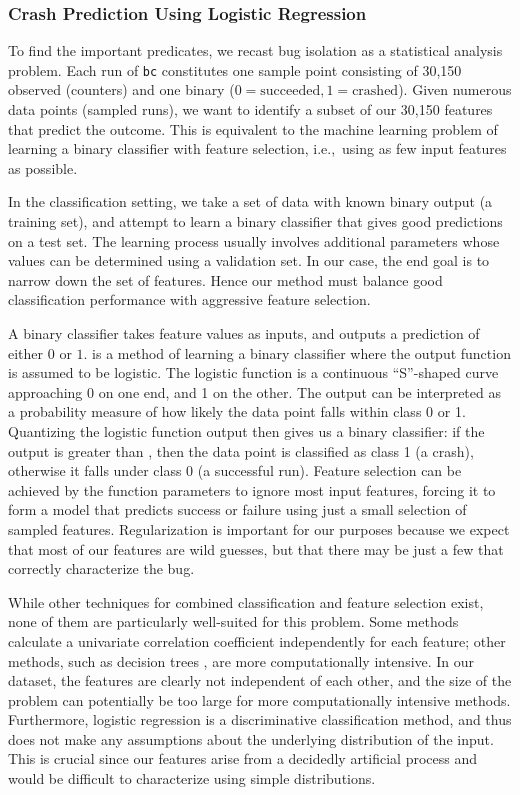 \subsubsection{Crash Prediction Using Logistic Regression}

To find the important predicates, we recast bug isolation as a
statistical analysis problem.  Each run of \texttt{bc} constitutes one
sample point consisting of 30,150 observed 
(counters) and one binary  ($0 = \text{succeeded}, 1
= \text{crashed}$).  Given numerous data points (sampled runs), we
want to identify a subset of our 30,150 features that predict the
outcome.  This is equivalent to the machine learning problem of
learning a binary classifier with feature selection, i.e.,\ using as
few input features as possible.

In the classification setting, we take a set of data with known binary
output (a training set), and attempt to learn a binary classifier that
gives good predictions on a test set.  The learning process usually
involves additional parameters whose values can be determined using a
validation set.  In our case, the end goal is to narrow down the set
of features.  Hence our method must balance good
classification performance with aggressive feature selection.

A binary classifier takes feature values as inputs, and outputs a
prediction of either $0$ or $1$.  
\cite{Hastie01} is a method of learning a binary classifier where the
output function is assumed to be logistic.  The logistic function is a
continuous ``S''-shaped curve approaching 0 on one end, and 1 on the
other.  The output can be interpreted as a probability measure of how
likely the data point falls within class 0 or 1.  Quantizing the
logistic function output then gives us a binary classifier: if the
output is greater than , then the data point is
classified as class 1 (a crash), otherwise it falls under class 0 (a
successful run).  Feature selection can be achieved by
 the function parameters to ignore most input
features, forcing it to form a model that predicts success or failure
using just a small selection of sampled features.  Regularization is
important for our purposes because we expect that most of our features
are wild guesses, but that there may be just a few that correctly
characterize the bug.

While other techniques for combined classification and feature
selection exist, none of them are particularly well-suited for this
problem.  Some methods \cite{Golub:MCC:1999,Tibshirani2002} calculate
a univariate correlation coefficient independently for each feature;
other methods, such as decision trees \cite{00000048}, are more
computationally intensive.  In our dataset, the features are clearly
not independent of each other, and the size of the problem can
potentially be too large for more computationally intensive methods.
Furthermore, logistic regression is a discriminative classification
method, and thus does not make any assumptions about the underlying
distribution of the input.  This is crucial since our features arise
from a decidedly artificial process and would be difficult to
characterize using simple distributions.

